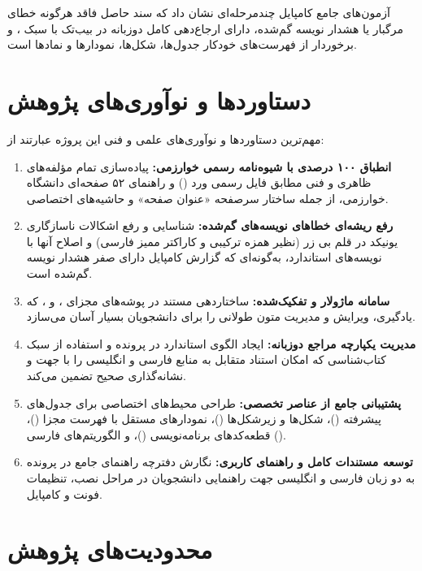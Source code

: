 آزمون‌های جامع کامپایل چندمرحله‌ای نشان داد که سند حاصل فاقد هرگونه خطای مرگبار یا هشدار نویسه گم‌شده، دارای ارجاع‌دهی کامل دوزبانه در بیب‌تک با سبک ، و برخوردار از فهرست‌های خودکار جدول‌ها، شکل‌ها، نمودارها و نمادها است.

\section{دستاوردها و نوآوری‌های پژوهش}
\label{sec:ch5_contributions}

مهم‌ترین دستاوردها و نوآوری‌های علمی و فنی این پروژه عبارتند از:
\begin{enumerate}
  \item \textbf{انطباق ۱۰۰ درصدی با شیوه‌نامه رسمی خوارزمی:} پیاده‌سازی تمام مؤلفه‌های ظاهری و فنی مطابق فایل رسمی ورد () و راهنمای ۵۲ صفحه‌ای دانشگاه خوارزمی، از جمله ساختار سرصفحه «عنوان \lr{|} صفحه» و حاشیه‌های اختصاصی.
  \item \textbf{رفع ریشه‌ای خطاهای نویسه‌های گم‌شده:} شناسایی و رفع اشکالات ناسازگاری یونیکد در قلم بی زر (نظیر همزه ترکیبی و کاراکتر ممیز فارسی) و اصلاح آنها با نویسه‌های استاندارد، به‌گونه‌ای که گزارش کامپایل دارای صفر هشدار نویسه گم‌شده است.
  \item \textbf{سامانه ماژولار و تفکیک‌شده:} ساختاردهی مستند در پوشه‌های مجزای ،  و ، که یادگیری، ویرایش و مدیریت متون طولانی را برای دانشجویان بسیار آسان می‌سازد.
  \item \textbf{مدیریت یکپارچه مراجع دوزبانه:} ایجاد الگوی استاندارد در پرونده  و استفاده از سبک کتاب‌شناسی  که امکان استناد متقابل به منابع فارسی و انگلیسی را با جهت و نشانه‌گذاری صحیح تضمین می‌کند.
  \item \textbf{پشتیبانی جامع از عناصر تخصصی:} طراحی محیط‌های اختصاصی برای جدول‌های پیشرفته ()، شکل‌ها و زیرشکل‌ها ()، نمودارهای مستقل با فهرست مجزا ()، قطعه‌کدهای برنامه‌نویسی ()، و الگوریتم‌های فارسی ().
  \item \textbf{توسعه مستندات کامل و راهنمای کاربری:} نگارش دفترچه راهنمای جامع در پرونده  به دو زبان فارسی و انگلیسی جهت راهنمایی دانشجویان در مراحل نصب، تنظیمات فونت و کامپایل.
\end{enumerate}

\section{محدودیت‌های پژوهش}
\label{sec:ch5_limitations}

